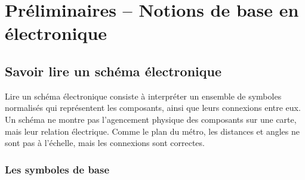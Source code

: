 \chapter{Préliminaires -- Notions de base en électronique}

\section{Savoir lire un schéma électronique}\label{sec:schematic}

Lire un schéma électronique consiste à interpréter un ensemble de symboles normalisés
qui représentent les composants, ainsi que leurs connexions entre eux.
Un schéma ne montre pas l’agencement physique des composants sur une carte, mais leur
relation électrique. Comme le plan du m\'etro, les distances et angles ne sont pas
à l’échelle, mais les connexions sont correctes.

\subsection{Les symboles de base}

